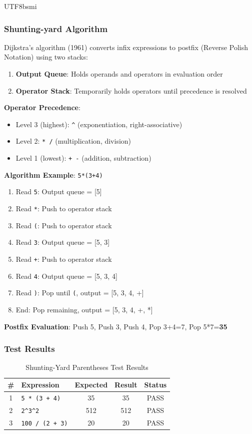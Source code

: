 \documentclass[journal,twoside]{IEEEtran}
\begin{document}
\begin{CJK}{UTF8}{bsmi}
\subsubsection{Shunting-yard Algorithm}
Dijkstra's algorithm (1961) converts infix expressions to postfix (Reverse Polish Notation) using two stacks:
\begin{enumerate}
    \item \textbf{Output Queue}: Holds operands and operators in evaluation order
    \item \textbf{Operator Stack}: Temporarily holds operators until precedence is resolved
\end{enumerate}

\textbf{Operator Precedence}:
\begin{itemize}
    \item Level 3 (highest): \texttt{\^{}} (exponentiation, right-associative)
    \item Level 2: \texttt{* /} (multiplication, division)
    \item Level 1 (lowest): \texttt{+ -} (addition, subtraction)
\end{itemize}

\textbf{Algorithm Example}: \texttt{5*(3+4)}
\begin{enumerate}
    \item Read \texttt{5}: Output queue = [5]
    \item Read \texttt{*}: Push to operator stack
    \item Read \texttt{(}: Push to operator stack
    \item Read \texttt{3}: Output queue = [5, 3]
    \item Read \texttt{+}: Push to operator stack
    \item Read \texttt{4}: Output queue = [5, 3, 4]
    \item Read \texttt{)}: Pop until \texttt{(}, output = [5, 3, 4, +]
    \item End: Pop remaining, output = [5, 3, 4, +, *]
\end{enumerate}

\textbf{Postfix Evaluation}: Push 5, Push 3, Push 4, Pop 3+4=7, Pop 5*7=\textbf{35}

\subsubsection{Test Results}
\begin{table}[htbp]
\centering
\caption{Shunting-Yard Parentheses Test Results}
\footnotesize
\begin{tabular}{@{}clccc@{}}
\toprule
\textbf{\#} & \textbf{Expression} & \textbf{Expected} & \textbf{Result} & \textbf{Status} \\
\midrule
1 & \texttt{5 * (3 + 4)} & 35 & 35 & PASS \\
2 & \texttt{2\textasciicircum 3\textasciicircum 2} & 512 & 512 & PASS \\
3 & \texttt{100 / (2 + 3)} & 20 & 20 & PASS \\
\bottomrule
\end{tabular}
\end{table}


\end{CJK}
\end{document}
